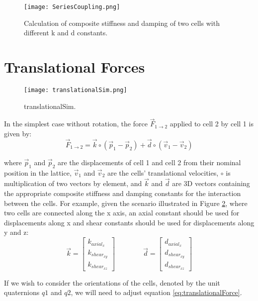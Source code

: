 { \begin{figure}
  \texttt{[image: SeriesCoupling.png]}
  \caption{Calculation of composite stiffness and damping of two cells with different k and d constants.}
  \label{fig:SeriesCoupling}
\end{figure}


\section{Translational Forces}

\begin{figure}
  \texttt{[image: translationalSim.png]}
  \caption{translationalSim.}
  \label{fig:translationalSim}
\end{figure}

In the simplest case without rotation, the force $\vec{F}_{1 \rightarrow 2}$ applied to cell 2 by cell 1 is given by:
\begin{equation} \label{eq:translationalForce}
\vec{F}_{1\rightarrow2} = \vec{k} \circ (\vec{p}_1 - \vec{p}_2) + \vec{d} \circ (\vec{v}_1 - \vec{v}_2)
\end{equation}

where $\vec{p}_1$ and $\vec{p}_2$ are the displacements of cell 1 and cell 2 from their nominal position in the lattice, $\vec{v}_1$ and $\vec{v}_2$ are the cells' translational velocities, $\circ$ is multiplication of two vectors by element, and $\vec{k}$ and $\vec{d}$ are 3D vectors containing the appropriate composite stiffness and damping constants for the interaction between the cells.  For example, given the scenario illustrated in Figure \ref{fig:translationalSim}, where two cells are connected along the x axis, an axial constant should be used for displacements along x and shear constants should be used for displacements along y and z:
\[ \vec{k} =  \left[ \begin{array}{ccc}
k_{axial_x}\\
k_{shear_{xy}}\\
k_{shear_{xz}}
 \end{array} \right]  
  \qquad\qquad
  \vec{d} =  \left[ \begin{array}{ccc}
d_{axial_x}\\
d_{shear_{xy}}\\
d_{shear_{xz}}
 \end{array} \right] \] 
 
If we wish to consider the orientations of the cells, denoted by the unit quaternions $q1$ and $q2$, we will need to adjust equation \ref{eq:translationalForce}. \\
  
}
